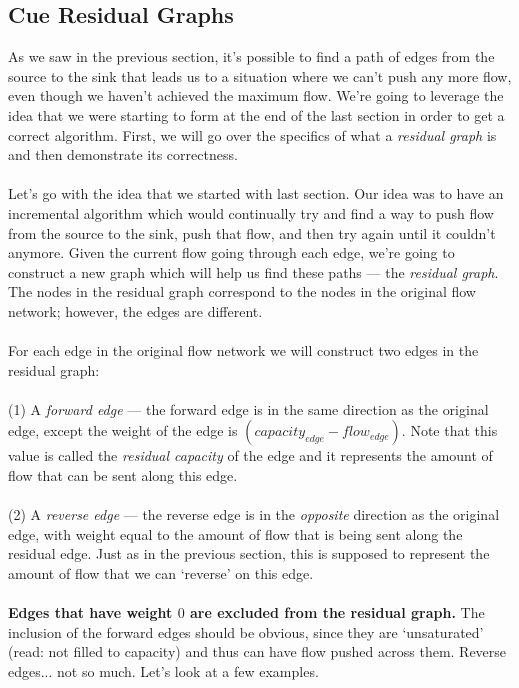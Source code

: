 \documentclass[11pt]{article}
\theoremstyle{plain}
\theoremstyle{definition}
\begin{document}
\subsection{Cue Residual Graphs}
As we saw in the previous section, it's possible to find a path of edges from the source to the sink that leads us to a situation where we can't push any more flow, even though we haven't achieved the maximum flow. We're going to leverage the idea that we were starting to form at the end of the last section in order to get a correct algorithm. First, we will go over the specifics of what a \emph{residual graph} is and then demonstrate its correctness.\\\\
Let's go with the idea that we started with last section. Our idea was to have an incremental algorithm which would continually try and find a way to push flow from the source to the sink, push that flow, and then try again until it couldn't anymore. Given the current flow going through each edge, we're going to construct a new graph which will help us find these paths --- the \emph{residual graph}. The nodes in the residual graph correspond to the nodes in the original flow network; however, the edges are different. \\\\
For each edge in the original flow network we will construct two edges in the residual graph:
\\\\
(1) A \emph{forward edge} --- the forward edge is in the same direction as the original edge, except the weight of the edge is $({capacity}_{edge} - {flow}_{edge})$. Note that this value is called the \emph{residual capacity} of the edge and it represents the amount of flow that can be sent along this edge.
\\\\
(2) A \emph{reverse edge} --- the reverse edge is in the \emph{opposite} direction as the original edge, with weight equal to the amount of flow that is being sent along the residual edge. Just as in the previous section, this is supposed to represent the amount of flow that we can `reverse' on this edge.
\\\\
{\bf{Edges that have weight $0$ are excluded from the residual graph.}} The inclusion of the forward edges should be obvious, since they are `unsaturated' (read: not filled to capacity) and thus can have flow pushed across them. Reverse edges... not so much. Let's look at a few examples.
\end{document}
